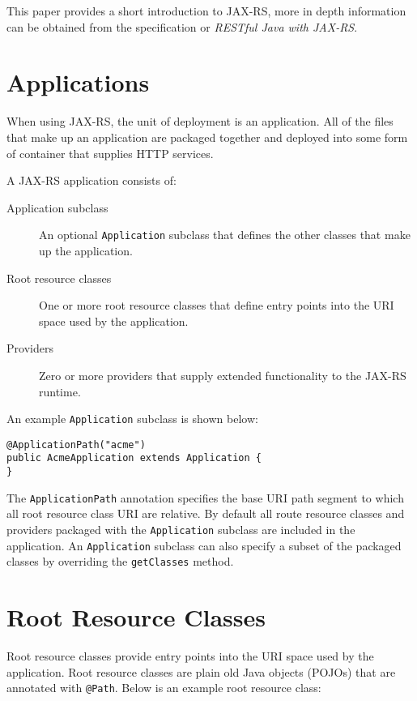 \documentclass{acm_proc_article-sp}
\begin{document}
This paper provides a short introduction to JAX-RS, more in depth information can be obtained from the specification\cite{jaxrs11} or \textit{RESTful Java with JAX-RS}\cite{burke:restfuljava}.

\section{Applications}

When using JAX-RS, the unit of deployment is an application. All of the files that make up an application are packaged together and deployed into some form of container that supplies HTTP services.

A JAX-RS application consists of:

\begin{description}
\item[Application subclass] An optional \texttt{Application} subclass that defines the other classes that make up the application.
\item[Root resource classes] One or more root resource classes that define entry points into the URI space used by the application.
\item[Providers] Zero or more providers that supply extended functionality to the JAX-RS runtime.
\end{description}

An example \texttt{Application} subclass is shown below:

\begin{verbatim}
@ApplicationPath("acme")
public AcmeApplication extends Application {
}
\end{verbatim}

The \texttt{ApplicationPath} annotation specifies the base URI path segment to which all root resource class URI are relative. By default all route resource classes and providers packaged with the \texttt{Application} subclass are included in the application. An \texttt{Application} subclass can also specify a subset of the packaged classes by overriding the \texttt{getClasses} method.

\section{Root Resource Classes}

Root resource classes provide entry points into the URI space used by the application. Root resource classes are plain old Java objects (POJOs) that are annotated with \texttt{@Path}. Below is an example root resource class:
\end{document}
